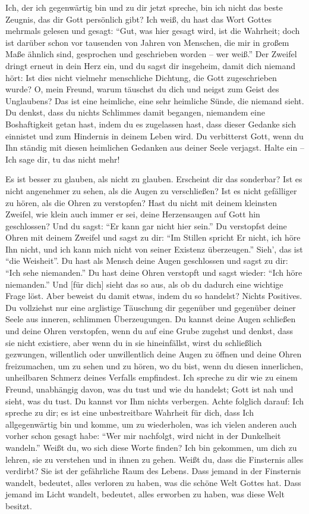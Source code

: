 Ich, der ich gegenwärtig bin und zu dir jetzt spreche, bin ich nicht das beste Zeugnis, das dir Gott persönlich gibt? Ich weiß, du hast das Wort Gottes mehrmals gelesen und gesagt: "`Gut, was hier gesagt wird, ist die Wahrheit; doch ist darüber schon vor tausenden von Jahren von Menschen, die mir in großem Maße ähnlich sind, gesprochen und geschrieben worden -- wer weiß."' Der Zweifel dringt erneut in dein Herz ein, und du sagst dir insgeheim, damit dich niemand hört: Ist dies nicht vielmehr menschliche Dichtung, die Gott zugeschrieben wurde? O, mein Freund, warum täuschst du dich und neigst zum Geist des Unglaubens? Das ist eine heimliche, eine sehr heimliche Sünde, die niemand sieht. Du denkst, dass du nichts Schlimmes damit begangen, niemandem eine Boshaftigkeit getan hast, indem du es zugelassen hast, dass dieser Gedanke sich einnistet und zum Hindernis in deinem Leben wird. Du verbitterst Gott, wenn du Ihn ständig mit diesen heimlichen Gedanken aus deiner Seele verjagst. Halte ein -- Ich sage dir, tu das nicht mehr! 

Es ist besser zu glauben, als nicht zu glauben. Erscheint dir das sonderbar? Ist es nicht angenehmer zu sehen, als die Augen zu verschließen? Ist es nicht gefälliger zu hören, als die Ohren zu verstopfen? Hast du nicht mit deinem kleinsten Zweifel, wie klein auch immer er sei, deine Herzensaugen auf Gott hin geschlossen? Und du sagst: "`Er kann gar nicht hier sein."' Du verstopfst deine Ohren mit deinem Zweifel und sagst zu dir: "`Im Stillen spricht Er nicht, ich höre Ihn nicht, und ich kann mich nicht von seiner Existenz überzeugen."' Sieh', das ist "`die Weisheit"'. Du hast als Mensch deine Augen geschlossen und sagst zu dir: "`Ich sehe niemanden."' Du hast deine Ohren verstopft und sagst wieder: "`Ich höre niemanden."' Und [für dich] sieht das so aus, als ob du dadurch eine wichtige Frage löst. Aber beweist du damit etwas, indem du so handelst? Nichts Positives. Du vollziehst nur eine arglistige Täuschung dir gegenüber und gegenüber deiner Seele aus inneren, schlimmen Überzeugungen. Du kannst deine Augen schließen und deine Ohren verstopfen, wenn du auf eine Grube zugehst und denkst, dass sie nicht existiere, aber wenn du in sie hineinfällst, wirst du schließlich gezwungen, willentlich oder unwillentlich deine Augen zu öffnen und deine Ohren freizumachen, um zu sehen und zu hören, wo du bist, wenn du diesen innerlichen, unheilbaren Schmerz deines Verfalls empfindest. Ich spreche zu dir wie zu einem Freund, unabhängig davon, was du tust und wie du handelst; Gott ist nah und sieht, was du tust. Du kannst vor Ihm nichts verbergen. Achte folglich darauf: Ich spreche zu dir; es ist eine unbestreitbare Wahrheit für dich, dass Ich allgegenwärtig bin und komme, um zu wiederholen, was ich vielen anderen auch vorher schon gesagt habe: "`Wer mir nachfolgt, wird nicht in der Dunkelheit wandeln."' Weißt du, wo sich diese Worte finden? Ich bin gekommen, um dich zu lehren, sie zu verstehen und in ihnen zu gehen. Weißt du, dass die Finsternis alles verdirbt? Sie ist der gefährliche Raum des Lebens. Dass jemand in der Finsternis wandelt, bedeutet, alles verloren zu haben, was die schöne Welt Gottes hat. Dass jemand im Licht wandelt, bedeutet, alles erworben zu haben, was diese Welt besitzt. 

